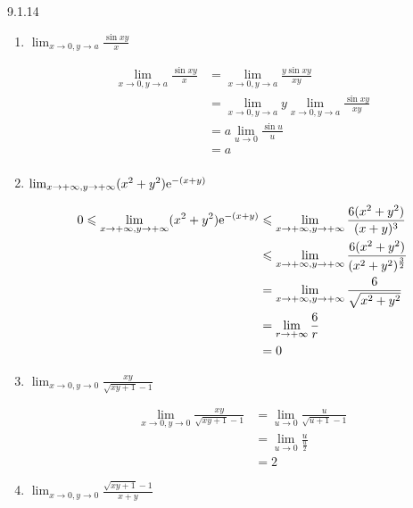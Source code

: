 \begin{exercise}{9.1.14}
    \begin{enumerate}
        \item[(2)] $\lim_{x\to0,y\to a}\frac{\sin xy}{x}$
        \begin{solution}
            \begin{align*}
                \lim_{x\to0,y\to a}\frac{\sin xy}{x}
                &=\lim_{x\to0,y\to a}\frac{y\sin xy}{xy}\\
                &=\lim_{x\to0,y\to a}y\lim_{x\to0,y\to a}\frac{\sin xy}{xy}\\
                &=a\lim_{u \to 0}\frac{\sin u}{u}\\
                &=a\\
            \end{align*}
        \end{solution}
        \item[(7)] $\lim_{x\to+\infty,y\to+\infty}(x^2+y^2)\mathrm{e}^{-(x+y)}$
        \begin{solution}
            \begin{align*}
                0\leqslant\lim_{x\to+\infty,y\to+\infty}(x^2+y^2)\mathrm{e}^{-(x+y)}
                &\leqslant\lim_{x\to+\infty,y\to+\infty}\frac{6(x^2+y^2)}{(x+y)^3}\\
                &\leqslant\lim_{x\to+\infty,y\to+\infty}\frac{6(x^2+y^2)}{(x^2+y^2)^{\frac{3}{2}}}\\
                &=\lim_{x\to+\infty,y\to+\infty}\frac{6}{\sqrt{x^2+y^2}}\\
                &=\lim_{r\to+\infty}\frac{6}{r}\\
                &=0
            \end{align*}
        \end{solution}
        \item[(9)] $\lim_{x\to0,y\to0}\frac{xy}{\sqrt{xy+1}-1}$
        \begin{solution}
            \begin{align*}
                \lim_{x\to0,y\to0}\frac{xy}{\sqrt{xy+1}-1}
                &=\lim_{u\to0}\frac{u}{\sqrt{u+1}-1}\\
                &=\lim_{u\to0}\frac{u}{\frac{u}{2}}\\
                &=2
            \end{align*}
        \end{solution}
                \item[(10)] $\lim_{x\to0,y\to0}\frac{\sqrt{xy+1}-1}{x+y}$
        \begin{solution}

\end{solution}
\end{enumerate}
\end{exercise}
